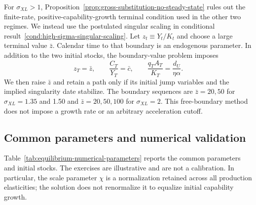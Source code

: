 For $\sigma_{XL}>1$, Proposition~\ref{prop:gross-substitution-no-steady-state}
rules out the finite-rate, positive-capability-growth terminal condition used in the
other two regimes. We
instead use the postulated singular scaling in conditional
result~\ref{cond:high-sigma-singular-scaling}. Let
$z_t\equiv Y_t/K_t$ and choose a large terminal value $\bar z$. Calendar time to
that boundary is an endogenous parameter. In addition to the two initial stocks,
the boundary-value problem imposes
\begin{equation}
    z_T=\bar z,
    \qquad
    \frac{C_T}{Y_T}=\bar c,
    \qquad
    \frac{q_TA_T}{K_T}=\frac{d_U}{\eta\alpha}.
    \label{eq:high-sigma-numerical-boundary}
\end{equation}
We then raise $\bar z$ and retain a path only if its initial jump variables and the
implied singularity date stabilize. The boundary sequences are $\bar z=20,50$ for
$\sigma_{XL}=1.35$ and 1.50 and $\bar z=20,50,100$ for $\sigma_{XL}=2$. This
free-boundary method does not impose a growth rate or an arbitrary acceleration
cutoff.

\subsection{Common parameters and numerical validation}

Table~\ref{tab:equilibrium-numerical-parameters} reports the common parameters and
initial stocks. The exercises are illustrative and are not a calibration. In
    particular, the scale parameter $\chi$ is a normalization retained across all
production elasticities; the solution does not renormalize it to equalize initial
capability growth.

